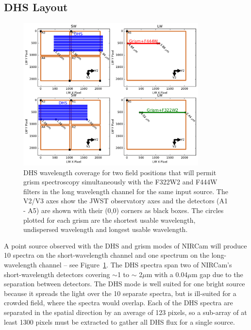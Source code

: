 \documentclass[iop]{emulateapj}
\newcommand{\DHSgap}{0.04}
\begin{document}
\subsection{DHS Layout}\label{sec:layout}

\begin{figure}
\centering
\includegraphics[width=0.85\textwidth]{grism_pos_for_max_wcoverage.pdf}
\caption{DHS wavelength coverage for two field positions that will permit grism spectroscopy simultaneously with the F322W2 and F444W filters in the long wavelength channel for the same input source. The V2/V3 axes show the JWST observatory axes and the detectors (A1 - A5) are shown with their (0,0) corners as black boxes. The circles plotted for each grism are the shortest usable wavelength, undispersed wavelength and longest usable wavelength.}\label{fig:DHSwaveWGrism}
\end{figure}

A point source observed with the DHS and grism modes of NIRCam will produce 10 spectra on the short-wavelength channel and one spectrum on the long-wavelength channel -- see Figure~\ref{fig:DHSwaveWGrism}.
The DHS spectra span two of NIRCam's short-wavelength detectors covering $\sim$1 to $\sim$ 2$\mu$m with a \DHSgap$\mu$m gap due to the separation between detectors.
The DHS mode is well suited for one bright source because it spreads the light over the 10 separate spectra, but is ill-suited for a crowded field, where the spectra would overlap.
Each of the DHS spectra are separated in the spatial direction by an average of 123 pixels, so a sub-array of at least 1300 pixels must be extracted to gather all DHS flux for a single source.
\end{document}
